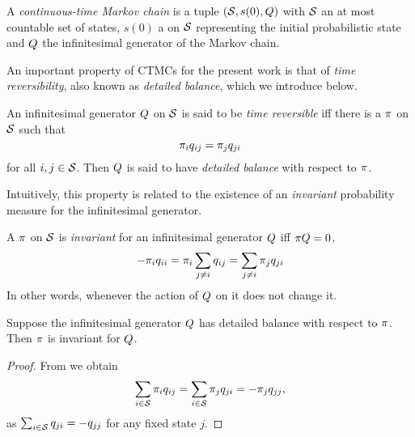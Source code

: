 \begin{definition}[CTMC]%
  A \emph{continuous-time Markov chain} is a tuple
  $\left(\mathcal{S}, s(0), Q\right)$ with
  $\mathcal{S}$ an at most countable set of states,
  $s(0)$ a \pmf on $\mathcal{S}$
  representing the initial probabilistic state and
  $Q$ the infinitesimal generator of the Markov chain.
\end{definition}

An important property of CTMCs for the present work is that of
\emph{time reversibility}, also known as \emph{detailed balance},
which we introduce below.

\begin{definition}
  An infinitesimal generator $Q$ on $\mathcal{S}$
  is said to be \emph{time reversible} iff
  there is a \pmf $\pi$ on $\mathcal{S}$ such that
  \begin{equation}
    \label{eq:detailed-balance}
    \pi_i q_{ij} = \pi_j q_{ji}
  \end{equation}
  for all $i,j \in \mathcal{S}$.
  Then $Q$ is said to have \emph{detailed balance}
  with respect to $\pi$.
\end{definition}

Intuitively, this property is related to the existence of an
\emph{invariant} probability measure for the infinitesimal generator.

\begin{definition}
  A \pmf $\pi$ on $\mathcal{S}$ is
  \emph{invariant} for an infinitesimal generator $Q$
  iff $\pi Q = 0$, \ie
  \[ -\pi_i q_{ii} = \pi_i \sum_{j \neq i} q_{ij}
                  = \sum_{j \neq i} \pi_j q_{ji} \]
  In other words,
  whenever the action of $Q$ on it does not change it.
\end{definition}

\begin{lemma}
  Suppose the infinitesimal generator $Q$
  has detailed balance with respect to $\pi$.
  Then $\pi$ is invariant for $Q$.
\end{lemma}
\begin{proof}
  From  we obtain
  \[ \sum_{i \in \mathcal{S}} \pi_i q_{ij} =
     \sum_{i \in \mathcal{S}} \pi_j q_{ji} = -\pi_j q_{jj}, \]
  as $\sum_{i \in \mathcal{S}} q_{ji} = -q_{jj}$ for any fixed state $j$.
\end{proof}

